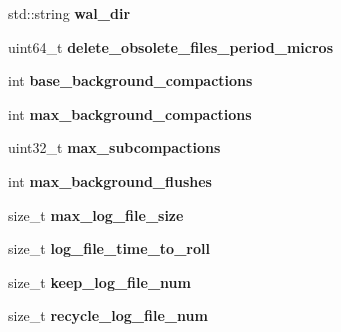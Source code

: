 \begin{DoxyCompactItemize}
\item 
std\+::string {\bfseries wal\+\_\+dir}\hypertarget{structrocksdb_1_1DBOptions_a384cdc01f0f2906930144381b93de2e0}{}\label{structrocksdb_1_1DBOptions_a384cdc01f0f2906930144381b93de2e0}

\item 
uint64\+\_\+t {\bfseries delete\+\_\+obsolete\+\_\+files\+\_\+period\+\_\+micros}\hypertarget{structrocksdb_1_1DBOptions_a9bad65d02bd2049d30b45599ef8c35bb}{}\label{structrocksdb_1_1DBOptions_a9bad65d02bd2049d30b45599ef8c35bb}

\item 
int {\bfseries base\+\_\+background\+\_\+compactions}\hypertarget{structrocksdb_1_1DBOptions_ace75f288ddb9afa9a81d53b1eff96b43}{}\label{structrocksdb_1_1DBOptions_ace75f288ddb9afa9a81d53b1eff96b43}

\item 
int {\bfseries max\+\_\+background\+\_\+compactions}\hypertarget{structrocksdb_1_1DBOptions_adc51fcd7138149a50ef57bf146aaaae3}{}\label{structrocksdb_1_1DBOptions_adc51fcd7138149a50ef57bf146aaaae3}

\item 
uint32\+\_\+t {\bfseries max\+\_\+subcompactions}\hypertarget{structrocksdb_1_1DBOptions_a870b445c2d1222939a4367a58a775574}{}\label{structrocksdb_1_1DBOptions_a870b445c2d1222939a4367a58a775574}

\item 
int {\bfseries max\+\_\+background\+\_\+flushes}\hypertarget{structrocksdb_1_1DBOptions_af0deda157b0ecb70121239429e55f548}{}\label{structrocksdb_1_1DBOptions_af0deda157b0ecb70121239429e55f548}

\item 
size\+\_\+t {\bfseries max\+\_\+log\+\_\+file\+\_\+size}\hypertarget{structrocksdb_1_1DBOptions_a091e003256873b2c5b23b9dbd4f0598b}{}\label{structrocksdb_1_1DBOptions_a091e003256873b2c5b23b9dbd4f0598b}

\item 
size\+\_\+t {\bfseries log\+\_\+file\+\_\+time\+\_\+to\+\_\+roll}\hypertarget{structrocksdb_1_1DBOptions_afa52da87a90d2453fe3c43a8fb2ea126}{}\label{structrocksdb_1_1DBOptions_afa52da87a90d2453fe3c43a8fb2ea126}

\item 
size\+\_\+t {\bfseries keep\+\_\+log\+\_\+file\+\_\+num}\hypertarget{structrocksdb_1_1DBOptions_ade2727a3b6e9b9a410ec2d5f3810a1a9}{}\label{structrocksdb_1_1DBOptions_ade2727a3b6e9b9a410ec2d5f3810a1a9}

\item 
size\+\_\+t {\bfseries recycle\+\_\+log\+\_\+file\+\_\+num}\hypertarget{structrocksdb_1_1DBOptions_a546aa687572f9d68f75d3918b527fe7e}{}\label{structrocksdb_1_1DBOptions_a546aa687572f9d68f75d3918b527fe7e}


\end{DoxyCompactItemize}
